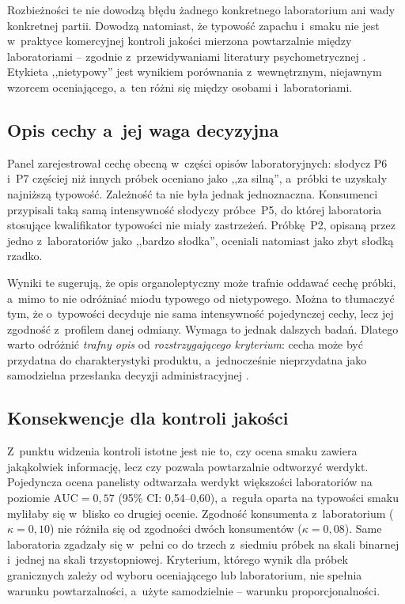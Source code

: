 Rozbieżności te nie dowodzą błędu żadnego konkretnego laboratorium ani wady
konkretnej partii. Dowodzą natomiast, że typowość zapachu i~smaku nie jest
w~praktyce komercyjnej kontroli jakości mierzona powtarzalnie między
laboratoriami -- zgodnie z~przewidywaniami literatury psychometrycznej
\cite{bartoshuk2003labeled,hodgson2009concordance,sipos2021panel}. Etykieta
,,nietypowy'' jest wynikiem porównania z~wewnętrznym, niejawnym wzorcem
oceniającego, a~ten różni się między osobami i~laboratoriami.

\subsection{Opis cechy a~jej waga decyzyjna}

Panel zarejestrował cechę obecną w~części opisów laboratoryjnych: słodycz
P6 i~P7 częściej niż innych próbek oceniano jako ,,za silną'', a~próbki te
uzyskały najniższą typowość. Zależność ta nie była jednak jednoznaczna.
Konsumenci przypisali taką samą intensywność słodyczy próbce~P5, do której
laboratoria stosujące kwalifikator typowości nie miały zastrzeżeń. Próbkę~P2,
opisaną przez jedno z~laboratoriów jako ,,bardzo słodka'', oceniali natomiast
jako zbyt słodką rzadko.

Wyniki te sugerują, że opis organoleptyczny może trafnie oddawać cechę
próbki, a~mimo to nie odróżniać miodu typowego od nietypowego. Można to
tłumaczyć tym, że o~typowości decyduje nie sama intensywność pojedynczej
cechy, lecz jej zgodność z~profilem danej odmiany. Wymaga to jednak
dalszych badań. Dlatego warto odróżnić \emph{trafny opis} od
\emph{rozstrzygającego kryterium}: cecha może być przydatna do
charakterystyki produktu, a~jednocześnie nieprzydatna jako samodzielna
przesłanka decyzji administracyjnej \cite{Gajda2026}.

\subsection{Konsekwencje dla kontroli jakości}

Z~punktu widzenia kontroli istotne jest nie to, czy ocena smaku zawiera
jakąkolwiek informację, lecz czy pozwala powtarzalnie odtworzyć werdykt.
Pojedyncza ocena panelisty odtwarzała werdykt większości laboratoriów na
poziomie $\mathrm{AUC} = 0{,}57$ (95\% CI: 0{,}54--0{,}60), a~reguła oparta
na typowości smaku myliłaby się w~blisko co drugiej ocenie. Zgodność
konsumenta z~laboratorium ($\kappa = 0{,}10$) nie różniła się od zgodności
dwóch konsumentów ($\kappa = 0{,}08$). Same laboratoria zgadzały się w~pełni
co do trzech z~siedmiu próbek na skali binarnej i~jednej na skali
trzystopniowej. Kryterium, którego wynik dla próbek granicznych zależy od
wyboru oceniającego lub laboratorium, nie spełnia warunku powtarzalności,
a~użyte samodzielnie -- warunku proporcjonalności.

